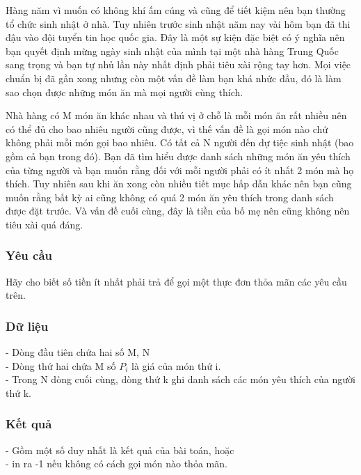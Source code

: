 







   Hàng năm vì muốn có không khí ấm cúng và cũng để tiết kiệm nên bạn thường tổ chức sinh nhật ở nhà. Tuy nhiên trước sinh nhật năm nay vài hôm bạn đã thi đậu vào đội tuyển tin học quốc gia. Đây là một sự kiện đặc biệt có ý nghĩa nên bạn quyết định mừng ngày sinh nhật của mình tại một nhà hàng Trung Quốc sang trọng và bạn tự nhủ lần này nhất định phải tiêu xài rộng tay hơn. Mọi việc chuẩn bị đã gần xong nhưng còn một vấn đề làm bạn khá nhức đầu, đó là làm sao chọn được những món ăn mà mọi người cùng thích.  

   Nhà hàng có M món ăn khác nhau và thú vị ở chỗ là mỗi món ăn rất nhiều nên có thể đủ cho bao nhiêu người cũng được, vì thế vấn đề là gọi món nào chứ không phải mỗi món gọi bao nhiêu. Có tất cả N người đến dự tiệc sinh nhật (bao gồm cả bạn trong đó). Bạn đã tìm hiểu được danh sách những món ăn yêu thích của từng người và bạn muốn rằng đối với mỗi người phải có ít nhất 2 món mà họ thích. Tuy nhiên sau khi ăn xong còn nhiều tiết mục hấp dẫn khác nên bạn cũng muốn rằng bất kỳ ai cũng không có quá 2 món ăn yêu thích trong danh sách được đặt trước. Và vấn đề cuối cùng, đây là tiền của bố mẹ nên cũng không nên tiêu xài quá đáng.  

\subsubsection{   Yêu cầu  }

   Hãy cho biết số tiền ít nhất phải trả để gọi một thực đơn thỏa mãn các yêu cầu trên.  

\subsubsection{   Dữ liệu  }

   - Dòng đầu tiên chứa hai số M, N   
\\   - Dòng thứ hai chứa M số $P_{i}$   là giá của món thứ i.   
\\   - Trong N dòng cuối cùng, dòng thứ k ghi danh sách các món yêu thích của người thứ k.  

\subsubsection{   Kết quả  }

   - Gồm một số duy nhất là kết quả của bài toán, hoặc   
\\   - in ra -1 nếu không có cách gọi món nào thỏa mãn.  

